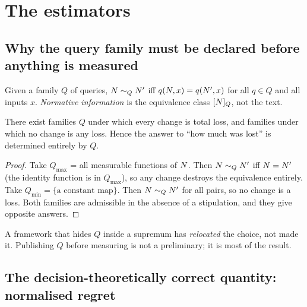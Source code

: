 \section{The estimators}
\label{sec:est}

\subsection{Why the query family must be declared before anything is measured}

\begin{definition}
Given a family $Q$ of queries, $N \sim_Q N'$ iff
$q(N,x) = q(N',x)$ for all $q \in Q$ and all inputs $x$. \emph{Normative
information} is the equivalence class $[N]_Q$, not the text.
\end{definition}

\begin{proposition}
\label{prop:Q}
There exist families $Q$ under which every change is total loss, and families
under which no change is any loss. Hence the answer to ``how much was lost'' is
determined entirely by $Q$.
\end{proposition}
\begin{proof}
Take $Q_{\max}$ = all measurable functions of $N$. Then $N\sim_{Q}N'$ iff
$N=N'$ (the identity function is in $Q_{\max}$), so any change destroys the
equivalence entirely. Take $Q_{\min} = \{\text{a constant map}\}$. Then
$N \sim_Q N'$ for all pairs, so no change is a loss. Both families are
admissible in the absence of a stipulation, and they give opposite answers.
\end{proof}

\begin{corollary}
A framework that hides $Q$ inside a supremum has \emph{relocated} the choice, not
made it. Publishing $Q$ before measuring is not a preliminary; it is most of the
result.
\end{corollary}

\subsection{The decision-theoretically correct quantity: normalised regret}

